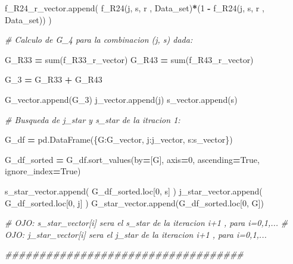 \documentclass[
  11pt,
  a4paper,
]{article}
\newenvironment{Shaded}{\begin{snugshade}}{\end{snugshade}}
\newcommand{\BuiltInTok}[1]{#1}
\newcommand{\CommentTok}[1]{\textcolor[rgb]{0.56,0.35,0.01}{\textit{#1}}}
\newcommand{\DecValTok}[1]{\textcolor[rgb]{0.00,0.00,0.81}{#1}}
\newcommand{\NormalTok}[1]{#1}
\newcommand{\OperatorTok}[1]{\textcolor[rgb]{0.81,0.36,0.00}{\textbf{#1}}}
\newcommand{\StringTok}[1]{\textcolor[rgb]{0.31,0.60,0.02}{#1}}
\newcommand{\VariableTok}[1]{\textcolor[rgb]{0.00,0.00,0.00}{#1}}
\begin{document}
\begin{Shaded}
\begin{Highlighting}[]
\NormalTok{                    f\_R24\_r\_vector.append( f\_R24(j, s, r , Data\_set)}\OperatorTok{*}\NormalTok{(}\DecValTok{1} \OperatorTok{{-}}\NormalTok{ f\_R24(j, s, r , Data\_set)) )}


            \CommentTok{\# Calculo de G\_4 para la combinacion (j, s) dada:}

\NormalTok{                G\_R33 }\OperatorTok{=}  \BuiltInTok{sum}\NormalTok{(f\_R33\_r\_vector)}
\NormalTok{                G\_R43 }\OperatorTok{=}  \BuiltInTok{sum}\NormalTok{(f\_R43\_r\_vector)}

\NormalTok{                G\_3 }\OperatorTok{=}\NormalTok{  G\_R33 }\OperatorTok{+}\NormalTok{ G\_R43}

\NormalTok{                G\_vector.append(G\_3)}
\NormalTok{                j\_vector.append(j)}
\NormalTok{                s\_vector.append(s)}


        \CommentTok{\# Busqueda de j\_star y s\_star de la itracion 1:}

\NormalTok{        G\_df }\OperatorTok{=}\NormalTok{ pd.DataFrame(\{}\StringTok{\textquotesingle{}G\textquotesingle{}}\NormalTok{:G\_vector, }\StringTok{\textquotesingle{}j\textquotesingle{}}\NormalTok{:j\_vector, }\StringTok{\textquotesingle{}s\textquotesingle{}}\NormalTok{:s\_vector\})}

\NormalTok{        G\_df\_sorted }\OperatorTok{=}\NormalTok{ G\_df.sort\_values(by}\OperatorTok{=}\NormalTok{[}\StringTok{\textquotesingle{}G\textquotesingle{}}\NormalTok{], axis}\OperatorTok{=}\DecValTok{0}\NormalTok{, ascending}\OperatorTok{=}\VariableTok{True}\NormalTok{, ignore\_index}\OperatorTok{=}\VariableTok{True}\NormalTok{)}

\NormalTok{        s\_star\_vector.append( G\_df\_sorted.loc[}\DecValTok{0}\NormalTok{, }\StringTok{\textquotesingle{}s\textquotesingle{}}\NormalTok{] )}
\NormalTok{        j\_star\_vector.append( G\_df\_sorted.loc[}\DecValTok{0}\NormalTok{, }\StringTok{\textquotesingle{}j\textquotesingle{}}\NormalTok{] )}
\NormalTok{        G\_star\_vector.append(G\_df\_sorted.loc[}\DecValTok{0}\NormalTok{, }\StringTok{\textquotesingle{}G\textquotesingle{}}\NormalTok{])}

        \CommentTok{\# OJO: s\_star\_vector[i] sera el s\_star de la iteracion i+1 , para i=0,1,...}
        \CommentTok{\# OJO: j\_star\_vector[i] sera el j\_star de la iteracion i+1 , para i=0,1,...        }


      \CommentTok{\#\#\#\#\#\#\#\#\#\#\#\#\#\#\#\#\#\#\#\#\#\#\#\#\#\#\#\#\#\#\#\#\#\#\#}


\end{Highlighting}
\end{Shaded}
\end{document}
